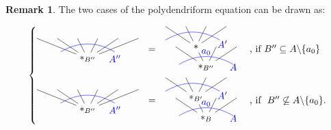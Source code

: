 \documentclass[11pt]{article}
\theoremstyle{definition}
\newtheorem{remark}[theo]{Remark}
\numberwithin{equation}{section}
\numberwithin{equation}{section}
\newcommand{\inc}{\subseteq}
\begin{document}
\begin{remark}
The two cases of the polydendriform equation can be drawn as:
\begin{center}

\begin{equation*}
  \left\{
      \begin{aligned}
\begin{tikzpicture}[scale=0.5,grow=up]
\node {$\ast_{B''}$} 
	child{}
	child{}
	child{}
	child{}
	child{}
	child{};
	\draw[blue] (-2,0.5) edge[in=150, out=30](2,0.5);
	\draw[blue] (2,0) node{$A''$};
	\end{tikzpicture}
& \raisebox{0.5cm}{\quad=\quad} 
\raisebox{-0.3cm}{\begin{tikzpicture}[scale=0.5,grow=up]
\node {$\ast_{B''}$} 
	child{}
	child{}
	child{node{$\ast$} 
			child{}
			child{}
			child{}
			child{}
	}
	child{}
;
	\draw[blue] (-2,0.2) edge[in=150, out=30](2,0.2);
	\draw[blue] (2,0) node{$A$};

	\draw[blue] (-3,2) edge[in=150, out=30](1,2);
	\draw[blue] (1.2,1.7) node{$A'$};
	\draw[blue] (0,1.1) node{$a_0$};
	
\end{tikzpicture}}
\raisebox{0.5cm}{\quad\text{, if} $B''\subseteq A\backslash\{a_0\}$} \\
\begin{tikzpicture}[scale=0.5,grow=up]
\node {$\ast_{B''}$} 
	child{}
	child{}
	child{}
	child{}
	child{}
	child{};
	\draw[blue] (-2,0.5) edge[in=150, out=30](2,0.5);
	\draw[blue] (2,0) node{$A''$};
	\end{tikzpicture}
& \raisebox{0.5cm}{\quad=\quad} 
\raisebox{-0.3cm}{\begin{tikzpicture}[scale=0.5,grow=up]
\node {$\ast_B$} 
	child{}
	child{}
	child{node{$\ast_{B'}$} 
			child{}
			child{}
			child{}
			child{}
	}
	child{}
;
	\draw[blue] (-2,0.2) edge[in=150, out=30](2,0.2);
	\draw[blue] (2,0) node{$A$};

	\draw[blue] (-3,2) edge[in=150, out=30](1,2);
	\draw[blue] (1.2,1.7) node{$A'$};
	\draw[blue] (0,1.1) node{$a_0$};
\end{tikzpicture}}
\raisebox{0.5cm}{\quad\text{, if } $B''\not\inc A\backslash\{a_0\}$.}
      \end{aligned}
    \right.
\end{equation*}
\end{center}

\end{remark}
\end{document}
